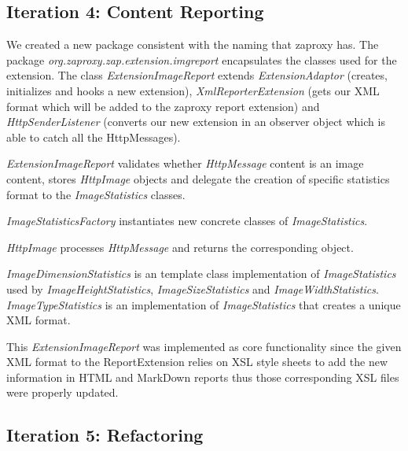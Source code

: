 \subsection{Iteration 4: Content Reporting}
We created a new package consistent with the naming that zaproxy has. The package \textit{org.zaproxy.zap.extension.imgreport} encapsulates the classes used for the extension. The class \textit{ExtensionImageReport} extends \textit{ExtensionAdaptor} (creates, initializes and hooks a new extension), \textit{XmlReporterExtension} (gets our XML format which will be added to the zaproxy report extension) and \textit{HttpSenderListener} (converts our new extension in an observer object which is able to catch all the HttpMessages).
\par
\textit{ExtensionImageReport} validates whether \textit{HttpMessage} content is an image content, stores \textit{HttpImage} objects and delegate the creation of specific statistics format to the \textit{ImageStatistics} classes. 
\par
\textit{ImageStatisticsFactory} instantiates new concrete classes of \textit{ImageStatistics}.
\par
\textit{HttpImage} processes \textit{HttpMessage} and returns the corresponding object.
\par
\textit{ImageDimensionStatistics} is an template class implementation of \textit{ImageStatistics} used by \textit{ImageHeightStatistics}, \textit{ImageSizeStatistics} and \textit{ImageWidthStatistics}. \textit{ImageTypeStatistics} is an implementation of \textit{ImageStatistics} that creates a unique XML format.
\par
This \textit{ExtensionImageReport} was implemented as core functionality since the given XML format to the ReportExtension relies on XSL style sheets to add the new information in HTML and MarkDown reports thus those corresponding XSL files were properly updated.

\subsection{Iteration 5: Refactoring}
